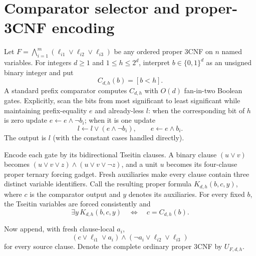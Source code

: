 \documentclass[11pt]{article}
\begin{document}
\section{Comparator selector and proper-3CNF encoding}
Let $F=\bigwedge_{i=1}^m(\ell_{i1}\vee\ell_{i2}\vee\ell_{i3})$ be any
ordered proper 3CNF on $n$ named variables.  For integers $d\ge1$ and
$1\le h\le2^d$, interpret $b\in\{0,1\}^d$ as an unsigned binary integer and
put
\[
 C_{d,h}(b)=[b<h].                                                 \tag{1}
\]
A standard prefix comparator computes $C_{d,h}$ with $O(d)$ fan-in-two
Boolean gates.  Explicitly, scan the bits from most significant to least
significant while maintaining prefix-equality $e$ and already-less $l$:
when the corresponding bit of $h$ is zero update
$e\leftarrow e\wedge\neg b_i$; when it is one update
\[
 l\leftarrow l\vee(e\wedge\neg b_i),\qquad
 e\leftarrow e\wedge b_i.                                        \tag{2}
\]
The output is $l$ (with the constant cases handled directly).

Encode each gate by its bidirectional Tseitin clauses.  A binary clause
$(u\vee v)$ becomes
$(u\vee v\vee z)\wedge(u\vee v\vee\neg z)$, and a unit $u$ becomes its
four-clause proper ternary forcing gadget.  Fresh auxiliaries make every
clause contain three distinct variable identifiers.  Call the resulting
proper formula $K_{d,h}(b,c,y)$, where $c$ is the comparator output and
$y$ denotes its auxiliaries.  For every fixed $b$, the Tseitin variables
are forced consistently and
\[
 \exists y\,K_{d,h}(b,c,y)\quad\Longleftrightarrow\quad
 c=C_{d,h}(b).                                                     \tag{3}
\]

Now append, with fresh clause-local $a_i$,
\[
 (c\vee\ell_{i1}\vee a_i)\wedge
 (\neg a_i\vee\ell_{i2}\vee\ell_{i3})                            \tag{4}
\]
for every source clause.  Denote the complete ordinary proper 3CNF by
$U_{F,d,h}$.
\end{document}
